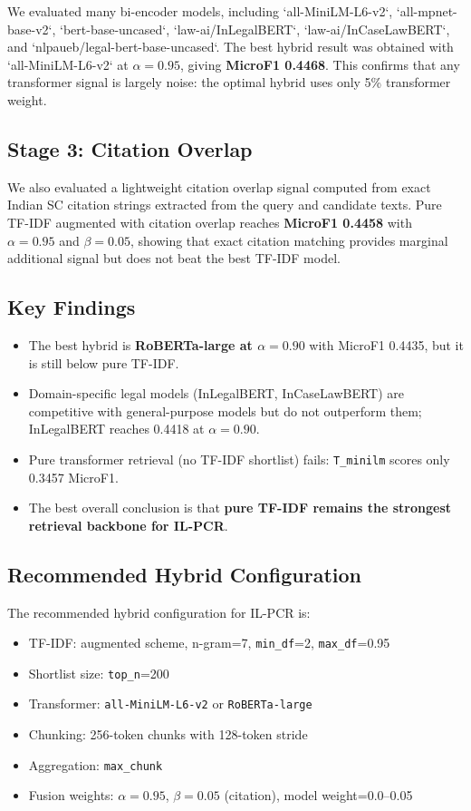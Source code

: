 \documentclass[11pt]{article}
\begin{document}
We evaluated many bi-encoder models, including `all-MiniLM-L6-v2`, `all-mpnet-base-v2`, `bert-base-uncased`, `law-ai/InLegalBERT`, `law-ai/InCaseLawBERT`, and `nlpaueb/legal-bert-base-uncased`.
The best hybrid result was obtained with `all-MiniLM-L6-v2` at $\alpha=0.95$, giving \textbf{MicroF1 0.4468}.
This confirms that any transformer signal is largely noise: the optimal hybrid uses only 5\% transformer weight.

\subsection{Stage 3: Citation Overlap}
We also evaluated a lightweight citation overlap signal computed from exact Indian SC citation strings extracted from the query and candidate texts.
Pure TF-IDF augmented with citation overlap reaches \textbf{MicroF1 0.4458} with $\alpha=0.95$ and $\beta=0.05$, showing that exact citation matching provides marginal additional signal but does not beat the best TF-IDF model.

\subsection{Key Findings}
\begin{itemize}
    \item The best hybrid is \textbf{RoBERTa-large at $\alpha=0.90$} with MicroF1 0.4435, but it is still below pure TF-IDF.
    \item Domain-specific legal models (InLegalBERT, InCaseLawBERT) are competitive with general-purpose models but do not outperform them; InLegalBERT reaches 0.4418 at $\alpha=0.90$.
    \item Pure transformer retrieval (no TF-IDF shortlist) fails: \texttt{T\_minilm} scores only 0.3457 MicroF1.
    \item The best overall conclusion is that \textbf{pure TF-IDF remains the strongest retrieval backbone for IL-PCR}.
\end{itemize}

\subsection{Recommended Hybrid Configuration}
The recommended hybrid configuration for IL-PCR is:
\begin{itemize}
    \item TF-IDF: augmented scheme, n-gram=7, \texttt{min\_df}=2, \texttt{max\_df}=0.95
    \item Shortlist size: \texttt{top\_n}=200
    \item Transformer: \texttt{all-MiniLM-L6-v2} or \texttt{RoBERTa-large}
    \item Chunking: 256-token chunks with 128-token stride
    \item Aggregation: \texttt{max\_chunk}
    \item Fusion weights: $\alpha=0.95$, $\beta=0.05$ (citation), model weight=0.0--0.05
\end{itemize}
\end{document}
